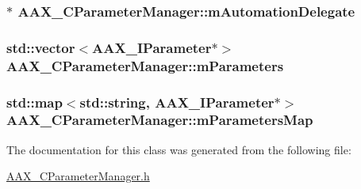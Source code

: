 \subsubsection[{m\+Automation\+Delegate}]{$\ast$ A\+A\+X\+\_\+\+C\+Parameter\+Manager\+::m\+Automation\+Delegate\hspace{0.3cm}{\ttfamily [protected]}}\label{a00034_a3c8bc6b5a9210cb9703798dd644a3d70}
\hypertarget{a00034_a59ea172cb668a4aaa990a66e2f67b0bb}{}
\subsubsection[{m\+Parameters}]{\setlength{\rightskip}{0pt plus 5cm}std\+::vector$<${\bf A\+A\+X\+\_\+\+I\+Parameter}$\ast$$>$ A\+A\+X\+\_\+\+C\+Parameter\+Manager\+::m\+Parameters\hspace{0.3cm}{\ttfamily [protected]}}\label{a00034_a59ea172cb668a4aaa990a66e2f67b0bb}
\hypertarget{a00034_a172b774237eadfd83d1ffa6b3d80bf09}{}
\subsubsection[{m\+Parameters\+Map}]{\setlength{\rightskip}{0pt plus 5cm}std\+::map$<$std\+::string, {\bf A\+A\+X\+\_\+\+I\+Parameter}$\ast$$>$ A\+A\+X\+\_\+\+C\+Parameter\+Manager\+::m\+Parameters\+Map\hspace{0.3cm}{\ttfamily [protected]}}\label{a00034_a172b774237eadfd83d1ffa6b3d80bf09}


The documentation for this class was generated from the following file\+:\begin{DoxyCompactItemize}
\item 
\hyperlink{a00191}{A\+A\+X\+\_\+\+C\+Parameter\+Manager.\+h}\end{DoxyCompactItemize}

